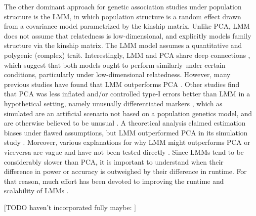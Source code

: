 \documentclass[11pt]{article}
\begin{document}
The other dominant approach for genetic association studies under population structure is the LMM, in which population structure is a random effect drawn from a covariance model parametrized by the kinship matrix.
Unlike PCA, LMM does not assume that relatedness is low-dimensional, and explicitly models family structure via the kinship matrix.
The LMM model assumes a quantitative and polygenic (complex) trait.
Interestingly, LMM and PCA share deep connections \citep{astle_population_2009, hoffman_correcting_2013}, which suggest that both models ought to perform similarly under certain conditions, particularly under low-dimensional relatedness.
However, many previous studies have found that LMM outperforms PCA \citep{
  zhao_arabidopsis_2007,
  astle_population_2009,
  kang_variance_2010,
  wu_comparison_2011, %
  song_testing_2015}.
Other studies find that PCA was less inflated and/or controlled type-I errors better than LMM in a hypothetical setting, namely unusually differentiated markers \citep{price_new_2010, wu_comparison_2011}, which as simulated are an artificial scenario not based on a population genetics model, and are otherwise believed to be unusual \citep{sul_mixed_2013, price_response_2013}.
A theoretical analysis claimed estimation biases under flawed assumptions, but LMM outperformed PCA in its simulation study \citep{wang_analytical_2013}.
Moreover, various explanations for why LMM might outperforms PCA or viceversa are vague and have not been tested directly \citep{price_new_2010, sul_mixed_2013, price_response_2013, hoffman_correcting_2013}.
Since LMMs tend to be considerably slower than PCA, it is important to understand when their difference in power or accuracy is outweighed by their difference in runtime.
For that reason, much effort has been devoted to improving the runtime and scalability of LMMs \citep{aulchenko_genomewide_2007, kang_efficient_2008, kang_variance_2010, zhang_mixed_2010, lippert_fast_2011, yang_gcta:_2011, listgarten_improved_2012, zhou_genome-wide_2012, svishcheva_rapid_2012, loh_efficient_2015, zhou_efficiently_2018}.

[TODO haven't incorporated fully maybe: \citep{thornton_roadtrips:_2010}]
\end{document}
